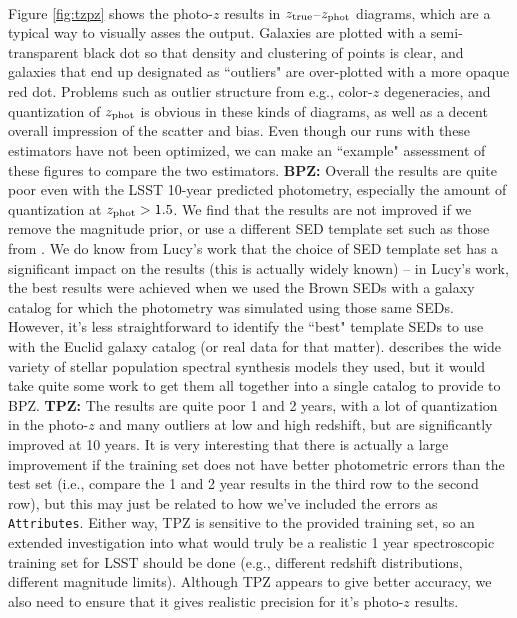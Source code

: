 \documentclass[DM,lsstdraft,toc]{lsstdoc}
\begin{document}
\smallskip {} \\
Figure \ref{fig:tzpz} shows the photo-$z$ results in $z_{\rm true}$--$z_{\rm phot}$ diagrams, which are a typical way to visually asses the output. Galaxies are plotted with a semi-transparent black dot so that density and clustering of points is clear, and galaxies that end up designated as ``outliers" are over-plotted with a more opaque red dot. Problems such as outlier structure from e.g., color-$z$ degeneracies, and quantization of $z_{\rm phot}$ is obvious in these kinds of diagrams, as well as a decent overall impression of the scatter and bias. Even though our runs with these estimators have not been optimized, we can make an ``example" assessment of these figures to compare the two estimators. 
{\bf BPZ:} Overall the results are quite poor even with the LSST 10-year predicted photometry, especially the amount of quantization at $z_{\rm phot}>1.5$. We find that the results are not improved if we remove the magnitude prior, or use a different SED template set such as those from \cite{2014ApJS..212...18B}. We do know from Lucy's work that the choice of SED template set has a significant impact on the results (this is actually widely known) -- in Lucy's work, the best results were achieved when we used the Brown SEDs with a galaxy catalog for which the photometry was simulated using those same SEDs. However, it's less straightforward to identify the ``best" template SEDs to use with the Euclid galaxy catalog (or real data for that matter). \cite{2014MNRAS.439..264G} describes the wide variety of stellar population spectral synthesis models they used, but it would take quite some work to get them all together into a single catalog to provide to BPZ. 
{\bf TPZ:} The results are quite poor 1 and 2 years, with a lot of quantization in the photo-$z$ and many outliers at low and high redshift, but are significantly improved at 10 years. It is very interesting that there is actually a large improvement if the training set does not have better photometric errors than the test set (i.e., compare the 1 and 2 year results in the third row to the second row), but this may just be related to how we've included the errors as {\tt Attributes}. Either way, TPZ is sensitive to the provided training set, so an extended investigation into what would truly be a realistic 1 year spectroscopic training set for LSST should be done (e.g., different redshift distributions, different magnitude limits). Although TPZ appears to give better accuracy, we also need to ensure that it gives realistic precision for it's photo-$z$ results.
\end{document}
